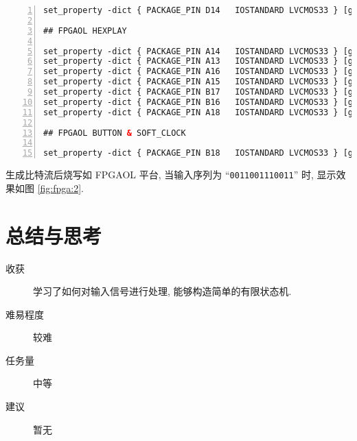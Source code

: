 \documentclass[UTF8,fontset=fandol]{ctexart}
\begin{document}
\begin{ExQuestions}
\begin{lstlisting}[basicstyle = \footnotesize\ttfamily, breaklines=true, numbers = left, language = XML, frame=lrtb, frameround=tttt, caption={题目 4. 的 xdc 文件}]
set_property -dict { PACKAGE_PIN D14   IOSTANDARD LVCMOS33 } [get_ports { sw }];

## FPGAOL HEXPLAY

set_property -dict { PACKAGE_PIN A14   IOSTANDARD LVCMOS33 } [get_ports { hexplay_data[0] }];
set_property -dict { PACKAGE_PIN A13   IOSTANDARD LVCMOS33 } [get_ports { hexplay_data[1] }];
set_property -dict { PACKAGE_PIN A16   IOSTANDARD LVCMOS33 } [get_ports { hexplay_data[2] }];
set_property -dict { PACKAGE_PIN A15   IOSTANDARD LVCMOS33 } [get_ports { hexplay_data[3] }];
set_property -dict { PACKAGE_PIN B17   IOSTANDARD LVCMOS33 } [get_ports { hexplay_an[0] }];
set_property -dict { PACKAGE_PIN B16   IOSTANDARD LVCMOS33 } [get_ports { hexplay_an[1] }];
set_property -dict { PACKAGE_PIN A18   IOSTANDARD LVCMOS33 } [get_ports { hexplay_an[2] }];

## FPGAOL BUTTON & SOFT_CLOCK

set_property -dict { PACKAGE_PIN B18   IOSTANDARD LVCMOS33 } [get_ports { btn }];
  \end{lstlisting}
  生成比特流后烧写如 FPGAOL 平台, 当输入序列为 ``\texttt{0011001110011}'' 时, 显示效果如图 \ref{fig:fpga:2}.
\end{ExQuestions}
\section*{总结与思考}
\begin{description}
    \item[收获] 学习了如何对输入信号进行处理, 能够构造简单的有限状态机.
    \item[难易程度] 较难
    \item[任务量] 中等
    \item[建议] 暂无
  \end{description}
\end{document}
